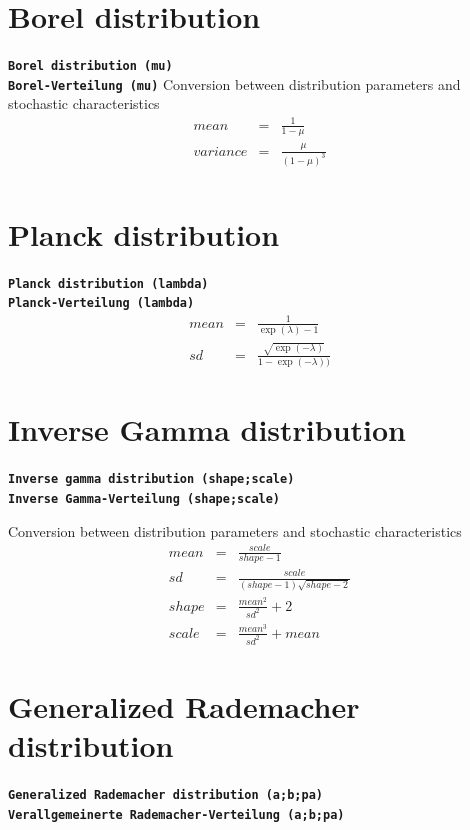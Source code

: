 \documentclass{svmono}
\def\cm#1{\textbf{\texttt{#1}}}
\begin{document}
\section*{Borel distribution}
\cm{Borel distribution (mu)}~\\
\cm{Borel-Verteilung (mu)}
Conversion between distribution parameters and stochastic characteristics
\begin{eqnarray*}
mean&=&\frac{1}{1-\mu}\\
variance&=&\frac{\mu}{(1-\mu)^3}\\
\end{eqnarray*}





\section*{Planck distribution}
\cm{Planck distribution (lambda)}~\\
\cm{Planck-Verteilung (lambda)}
\begin{eqnarray*}
mean&=&\frac{1}{\exp(\lambda)-1}\\
sd&=&\frac{\sqrt{\exp(-\lambda)}}{1-\exp(-\lambda))}
\end{eqnarray*}





\section*{Inverse Gamma distribution}
\cm{Inverse gamma distribution (shape;scale)}~\\
\cm{Inverse Gamma-Verteilung (shape;scale)}

Conversion between distribution parameters and stochastic characteristics
\begin{eqnarray*}
mean&=&\frac{scale}{shape-1}\\
sd&=&\frac{scale}{(shape-1)\sqrt{shape-2}}\\
shape&=&\frac{mean^2}{sd^2}+2\\
scale&=&\frac{mean^3}{sd^2}+mean
\end{eqnarray*}





\section*{Generalized Rademacher distribution}
\cm{Generalized Rademacher distribution (a;b;pa)}~\\
\cm{Verallgemeinerte Rademacher-Verteilung (a;b;pa)}
\end{document}
